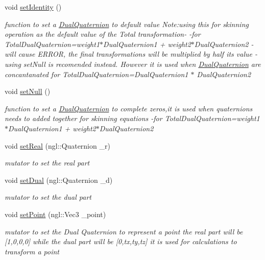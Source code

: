 \begin{DoxyCompactItemize}
void \hyperlink{class_dual_quaternion_a4afc472e16b56beb91be86db20687871}{set\-Identity} ()
\begin{DoxyCompactList}\small\item\em function to set a \hyperlink{class_dual_quaternion}{Dual\-Quaternion} to default value Note\-:using this for skinning operation as the default value of the Total transformation-\/ -\/for Total\-Dual\-Quaternion=weight1$\ast$\-Dual\-Quaternion1 + weight2$\ast$\-Dual\-Quaternion2 -\/will cause E\-R\-R\-O\-R, the final transformations will be multiplied by half its value -\/using set\-Null is recomended instead. However it is used when \hyperlink{class_dual_quaternion}{Dual\-Quaternion} are concantanated for Total\-Dual\-Quaternion=Dual\-Quaternion1 $\ast$ Dual\-Quaternion2 \end{DoxyCompactList}\item 
void \hyperlink{class_dual_quaternion_a70fbf1890652f2d288370dfa057b50ad}{set\-Null} ()
\begin{DoxyCompactList}\small\item\em function to set a \hyperlink{class_dual_quaternion}{Dual\-Quaternion} to complete zeros,it is used when quaternions needs to added together for skinning equations -\/for Total\-Dual\-Quaternion=weight1$\ast$\-Dual\-Quaternion1 + weight2$\ast$\-Dual\-Quaternion2 \end{DoxyCompactList}\item 
void \hyperlink{class_dual_quaternion_a9fca08294ddcb6c7640dd9aa314b6517}{set\-Real} (ngl\-::\-Quaternion \-\_\-r)
\begin{DoxyCompactList}\small\item\em mutator to set the real part \end{DoxyCompactList}\item 
void \hyperlink{class_dual_quaternion_ac46b1a9cc107547dcde4a40f61feb3c7}{set\-Dual} (ngl\-::\-Quaternion \-\_\-d)
\begin{DoxyCompactList}\small\item\em mutator to set the dual part \end{DoxyCompactList}\item 
void \hyperlink{class_dual_quaternion_a03af608a88436b25c7eea9acbfe9b72f}{set\-Point} (ngl\-::\-Vec3 \-\_\-point)
\begin{DoxyCompactList}\small\item\em mutator to set the Dual Quaternion to represent a point the real part will be \mbox{[}1,0,0,0\mbox{]} while the dual part will be \mbox{[}0,tx,ty,tz\mbox{]} it is used for calculations to transform a point \end{DoxyCompactList}\item 

\end{DoxyCompactItemize}
